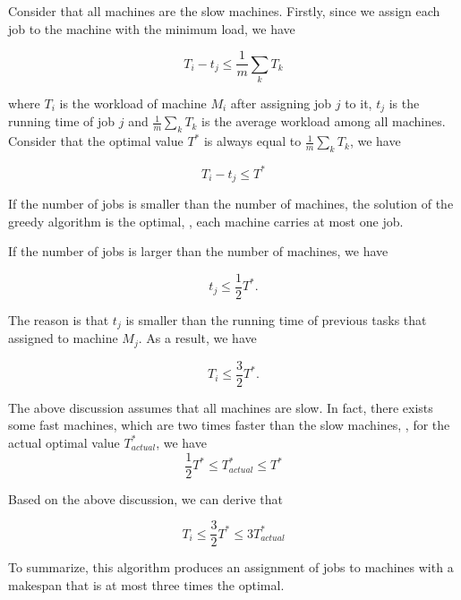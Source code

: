 \begin{problem}
    Consider that all machines are the slow machines. Firstly, since we assign each job to the machine with the minimum load, we have
    
    \begin{equation}
      T_i-t_j\leq \frac{1}{m}\sum_{k}T_k
    \end{equation}
    
    where $T_i$ is the workload of machine $M_i$ after assigning job $j$ to it, $t_j$ is the running time of job $j$ and $\frac{1}{m}\sum_{k}T_k$ is the average workload among all machines. Consider that the optimal value $T^*$ is always equal to $\frac{1}{m}\sum_{k}T_k$, we have
    
    \begin{equation}
      T_i-t_j\leq T^*
    \end{equation}
    
    If the number of jobs is smaller than the number of machines, the solution of the greedy algorithm is the optimal, \ie, each machine carries at most one job. 
    
    If the number of jobs is larger than the number of machines, we have
    
    \begin{equation}
      t_j \leq \frac{1}{2}T^*.
    \end{equation}
    
    The reason is that $t_j$ is smaller than the running time of previous tasks that assigned to machine $M_j$. As a result, we have

    \begin{equation}
      T_i\leq \frac{3}{2}T^*.
    \end{equation}
    
    The above discussion assumes that all machines are slow. In fact, there exists some fast machines, which are two times faster than the slow machines, \ie, for the actual optimal value $T_{actual}^*$, we have
    \begin{equation}
      \frac{1}{2}T^* \leq T_{actual}^*\leq T^*
    \end{equation}

    Based on the above discussion, we can derive that
    
    \begin{equation}
      T_i\leq \frac{3}{2}T^*\leq 3T_{actual}^*
    \end{equation}
    
    To summarize, this algorithm produces an assignment of jobs to machines with a makespan that is at most three times the optimal.
  \end{problem}
  
